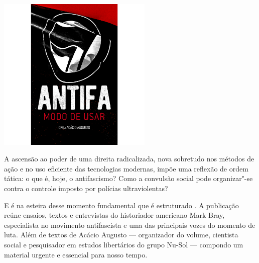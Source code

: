 \pagebreak %

\begin{center}
\hspace*{-3.6cm}
\hspace*{3.1cm}\includegraphics[width=74mm]{./grid/antifa.png}
\end{center}

\hspace*{-7cm}\hrulefill\hspace*{-7cm}

\medskip

\noindent{}A ascensão ao poder de uma direita radicalizada, nova sobretudo nos métodos de ação e no uso eficiente das tecnologias modernas, impõe uma reflexão de ordem tática: o que é, hoje, o antifascismo? Como a convulsão social pode organizar"-se contra o controle imposto por polícias ultraviolentas?

E é na esteira desse momento fundamental que é estruturado {}. A publicação reúne ensaios, textos e entrevistas do historiador americano Mark Bray, especialista no movimento antifascista e uma das principais vozes do momento de luta. Além de textos de Acácio Augusto --- organizador do volume, cientista social e pesquisador em estudos libertários do grupo Nu-Sol --- compondo um material urgente e essencial para nosso tempo.

\vfill

\hspace*{-.4cm}\begin{minipage}[c]{.5\linewidth}
\small{
{}}
\end{minipage}

